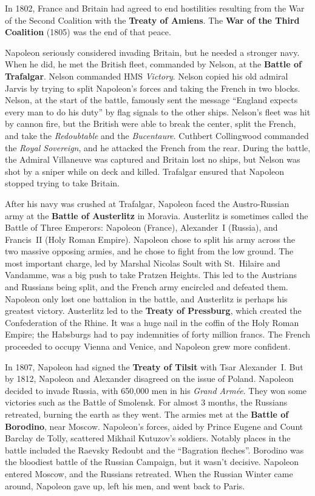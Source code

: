 In 1802, France and Britain had agreed to end hostilities resulting from the War of the Second Coalition
with the \textbf{Treaty of Amiens}.
The \textbf{War of the Third Coalition} (1805) was the end of that peace.

Napoleon seriously considered invading Britain, but he needed a stronger navy.
When he did, he met the British fleet, commanded by Nelson, at the \textbf{Battle of Trafalgar}.
Nelson commanded HMS \textit{Victory}.
Nelson copied his old admiral Jarvis by trying to split Napoleon's forces and taking the French in two blocks.
Nelson, at the start of the battle, famously sent the message
``England expects every man to do his duty'' by flag signals to the other ships.
Nelson's fleet was hit by cannon fire, but the British were able to break the center, split the French,
and take the \textit{Redoubtable} and the \textit{Bucentaure}.
Cuthbert Collingwood commanded the \textit{Royal Sovereign}, and he attacked the French from the rear.
During the battle, the Admiral Villaneuve was captured and Britain lost no ships,
but Nelson was shot by a sniper while on deck and killed.
Trafalgar ensured that Napoleon stopped trying to take Britain.

After his navy was crushed at Trafalgar,
Napoleon faced the Austro-Russian army at the \textbf{Battle of Austerlitz} in Moravia.
Austerlitz is sometimes called the Battle of Three Emperors:
Napoleon (France), Alexander~I (Russia), and Francis~II (Holy Roman Empire).
Napoleon chose to split his army across the two massive opposing armies, and he chose to fight from the low ground.
The most important charge, led by Marshal Nicolas Soult with St.\ Hilaire and Vandamme,
was a big push to take Pratzen Heights.
This led to the Austrians and Russians being split, and the French army encircled and defeated them.
Napoleon only lost one battalion in the battle, and Austerlitz is perhaps his greatest victory.
Austerlitz led to the \textbf{Treaty of Pressburg}, which created the Confederation of the Rhine.
It was a huge nail in the coffin of the Holy Roman Empire;
the Habsburgs had to pay indemnities of forty million francs.
The French proceeded to occupy Vienna and Venice, and Napoleon grew more confident.

In 1807, Napoleon had signed the \textbf{Treaty of Tilsit} with Tsar Alexander~I.
But by 1812, Napoleon and Alexander disagreed on the issue of Poland.
Napoleon decided to invade Russia, with 650,000 men in his \textit{Grand Arm\'ee}.
They won some victories such as the Battle of Smolensk.
For almost 3 months, the Russians retreated, burning the earth as they went.
The armies met at the \textbf{Battle of Borodino}, near Moscow.
Napoleon's forces, aided by Prince Eugene and Count Barclay de Tolly, scattered Mikhail Kutuzov's soldiers.
Notably places in the battle included the Raevsky Redoubt and the ``Bagration fleches''.
Borodino was the bloodiest battle of the Russian Campaign, but it wasn't decisive.
Napoleon entered Moscow, and the Russians retreated.
When the Russian Winter came around, Napoleon gave up, left his men, and went back to Paris.

